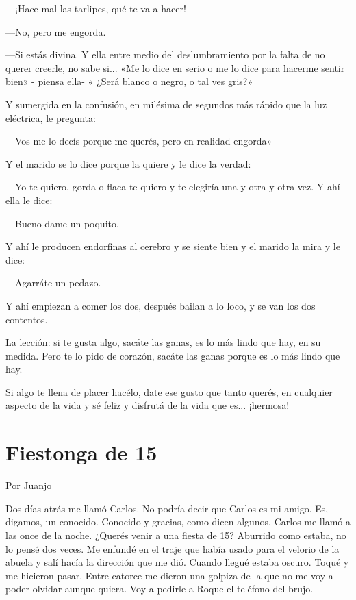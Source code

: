 \documentclass[11pt,twoside,openright,a5paper]{book}
\begin{document}
---¡Hace mal las tarlipes, qué te  va a hacer!

---No, pero me engorda.

---Si estás divina. Y  ella entre medio del deslumbramiento por la falta de no querer creerle, no sabe si... «Me  lo dice en serio o me lo dice para hacerme sentir bien» - piensa ella- « ¿Será blanco o negro, o tal ves gris?»

Y sumergida en la confusión,  en milésima de segundos más rápido que la luz eléctrica, le pregunta:

---Vos me lo decís porque me querés,  pero en realidad engorda»

Y el marido se lo dice porque la quiere y le dice la verdad:

---Yo te quiero,  gorda o flaca te quiero y te elegiría  una y otra y otra vez. Y ahí ella le dice:

---Bueno dame un poquito.

Y ahí le producen endorfinas al cerebro y se siente bien y el marido la mira y le dice:

---Agarráte un pedazo.

Y ahí empiezan a comer los dos, después bailan a lo loco, y se van los dos contentos.

La lección: si te gusta algo, sacáte las  ganas,  es lo más lindo que hay,  en su medida. Pero te lo pido de corazón, sacáte las ganas porque es lo más lindo que hay.

Si algo te llena de placer hacélo, date ese gusto que tanto querés, en cualquier aspecto de la vida y sé feliz y disfrutá de la vida que es... ¡hermosa!


\section*{Fiestonga de 15 }

                                                                                        \begin{flushright}Por Juanjo\end{flushright}


Dos días atrás me llamó Carlos. No podría decir que Carlos es mi amigo. Es, digamos, un conocido. Conocido y gracias, como dicen algunos. Carlos me llamó a las once de la noche. ¿Querés venir a una fiesta de 15? Aburrido como estaba, no lo pensé dos veces. Me enfundé en el traje que había usado para el velorio de la abuela y salí hacía la dirección que me dió. Cuando llegué estaba oscuro. Toqué y me hicieron pasar. Entre catorce me dieron una golpiza de la que no me voy a poder olvidar aunque quiera. Voy a pedirle a Roque el teléfono del brujo.
\end{document}
